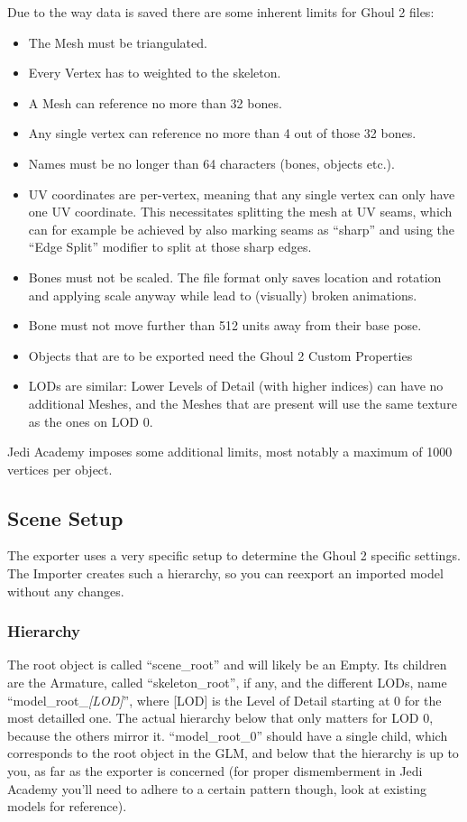 \documentclass[a4paper,10pt]{article}
\begin{document}
 Due to the way data is saved there are some inherent limits for Ghoul 2 files:
 \begin{itemize}
  \item The Mesh must be triangulated.
  \item Every Vertex has to weighted to the skeleton.
  \item A Mesh can reference no more than 32 bones.
  \item Any single vertex can reference no more than 4 out of those 32 bones.
  \item Names must be no longer than 64 characters (bones, objects etc.).
  \item UV coordinates are per-vertex, meaning that any single vertex can only have one UV coordinate. This
  necessitates splitting the mesh at UV seams, which can for example be achieved by also marking seams as
  ``sharp'' and using the ``Edge Split'' modifier to split at those sharp edges.
  \item Bones must not be scaled. The file format only saves location and rotation and applying scale anyway
  while lead to (visually) broken animations.
  \item Bone must not move further than 512 units away from their base pose.
  \item Objects that are to be exported need the Ghoul 2 Custom Properties
  \item LODs are similar: Lower Levels of Detail (with higher indices) can have no additional Meshes, and the
  Meshes that are present will use the same texture as the ones on LOD 0.
 \end{itemize}
 Jedi Academy imposes some additional limits, most notably a maximum of 1000 vertices per object.
 
 \subsection{Scene Setup}
 
 The exporter uses a very specific setup to determine the Ghoul 2 specific settings. The Importer creates
 such a hierarchy, so you can reexport an imported model without any changes.
 
 \subsubsection{Hierarchy}
 
 The root object is called ``scene\_root'' and will likely be an Empty. Its children are the Armature, called
 ``skeleton\_root'', if any, and the different LODs, name ``model\_root\_\emph{[LOD]}'', where [LOD] is the Level
 of Detail starting at 0 for the most detailled one. The actual hierarchy below that only matters for LOD 0,
 because the others mirror it. ``model\_root\_0'' should have a single child, which corresponds to the root
 object in the GLM, and below that the hierarchy is up to you, as far as the exporter is concerned (for proper
 dismemberment in Jedi Academy you'll need to adhere to a certain pattern though, look at existing  models
 for reference).
 
\end{document}
